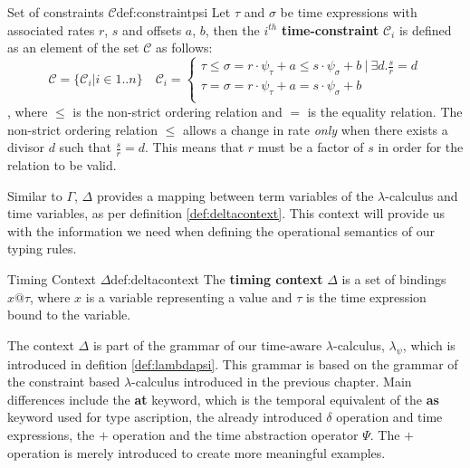 \begin{definitiontitled}{Set of constraints $\mathcal{C}$}{def:constraintpsi}
Let $\tau$ and $\sigma$ be time expressions with associated rates $r$, $s$ and offsets $a$, $b$, then the $i^{th}$ \textbf{time-constraint} $\mathcal{C}_i$ is defined as an element of the set $\mathcal{C}$ as follows:
\[
\mathcal{C}   = \{\mathcal{C}_i | i \in 1..n\} \quad
\mathcal{C}_i = \left\{ 
  \begin{array}{l} 
  \tau \le \sigma = r \cdot \psi_\tau + a \le s \cdot \psi_\sigma + b \: | \: \exists d. \frac{s}{r} = d \\ 
  \tau = \sigma = r \cdot \psi_\tau + a = s \cdot \psi_\sigma + b\\ 
\end{array} \right.
\]
, where $\le$ is the non-strict ordering relation and $=$ is the equality relation.
The non-strict ordering relation $\le$ allows a change in rate \textit{only} when there exists a divisor $d$ such that $\frac{s}{r} = d$.
This means that $r$ must be a factor of $s$ in order for the relation to be valid.
\end{definitiontitled}

Similar to $\Gamma$, $\Delta$ provides a mapping between term variables of the $\lambda$-calculus and time variables, as per definition \ref{def:deltacontext}.
This context will provide us with the information we need when defining the operational semantics of our typing rules.

\begin{definitiontitled}{Timing Context $\Delta$}{def:deltacontext}
The \textbf{timing context} $\Delta$ is a set of bindings $x@\tau$, where $x$ is a variable representing a value and $\tau$ is the time expression bound to the variable.
\end{definitiontitled}

The context $\Delta$ is part of the grammar of our time-aware $\lambda$-calculus, $\lambda_\psi$, which is introduced in defition \ref{def:lambdapsi}.  
This grammar is based on the grammar of the constraint based $\lambda$-calculus introduced in the previous chapter.
Main differences include the \textbf{at} keyword, which is the temporal equivalent of the \textbf{as} keyword used for type ascription, the already introduced $\delta$ operation and time expressions, the $+$ operation and the time abstraction operator $\Psi$.
The $+$ operation is merely introduced to create more meaningful examples.

